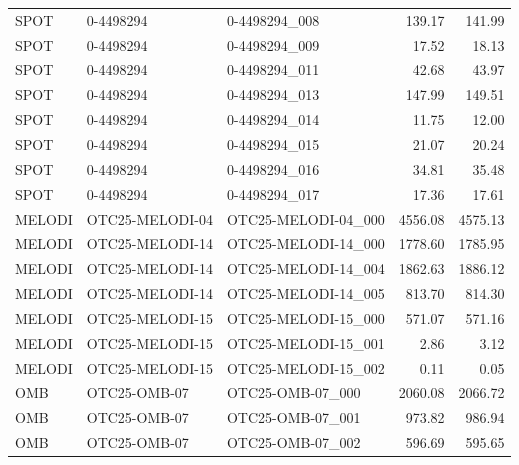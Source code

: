 \begin{tabular}{lllrr}
SPOT & 0-4498294 & 0-4498294_008 & 139.17 & 141.99 \\
SPOT & 0-4498294 & 0-4498294_009 & 17.52 & 18.13 \\
SPOT & 0-4498294 & 0-4498294_011 & 42.68 & 43.97 \\
SPOT & 0-4498294 & 0-4498294_013 & 147.99 & 149.51 \\
SPOT & 0-4498294 & 0-4498294_014 & 11.75 & 12.00 \\
SPOT & 0-4498294 & 0-4498294_015 & 21.07 & 20.24 \\
SPOT & 0-4498294 & 0-4498294_016 & 34.81 & 35.48 \\
SPOT & 0-4498294 & 0-4498294_017 & 17.36 & 17.61 \\
MELODI & OTC25-MELODI-04 & OTC25-MELODI-04_000 & 4556.08 & 4575.13 \\
MELODI & OTC25-MELODI-14 & OTC25-MELODI-14_000 & 1778.60 & 1785.95 \\
MELODI & OTC25-MELODI-14 & OTC25-MELODI-14_004 & 1862.63 & 1886.12 \\
MELODI & OTC25-MELODI-14 & OTC25-MELODI-14_005 & 813.70 & 814.30 \\
MELODI & OTC25-MELODI-15 & OTC25-MELODI-15_000 & 571.07 & 571.16 \\
MELODI & OTC25-MELODI-15 & OTC25-MELODI-15_001 & 2.86 & 3.12 \\
MELODI & OTC25-MELODI-15 & OTC25-MELODI-15_002 & 0.11 & 0.05 \\
OMB & OTC25-OMB-07 & OTC25-OMB-07_000 & 2060.08 & 2066.72 \\
OMB & OTC25-OMB-07 & OTC25-OMB-07_001 & 973.82 & 986.94 \\
OMB & OTC25-OMB-07 & OTC25-OMB-07_002 & 596.69 & 595.65 \\
\bottomrule
\end{tabular}
